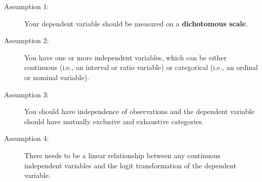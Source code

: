 \documentclass[a4paper,12pt]{article}
\begin{document}
\begin{framed}
	\begin{description}
		\item[Assumption 1:] Your dependent variable should be measured on a \textbf{dichotomous scale}.
		
		
		\item[Assumption 2:] You have one or more independent variables, which can be either continuous (i.e., an interval or ratio variable) or categorical (i.e., an ordinal or nominal variable). 
		
		
		
		\item[Assumption 3:] You should have independence of observations and the dependent variable should have mutually exclusive and exhaustive categories.
		
		\item[Assumption 4:] There needs to be a linear relationship between any continuous independent variables and the logit transformation of the dependent variable. 
	\end{description}
\end{framed}
\end{document}
